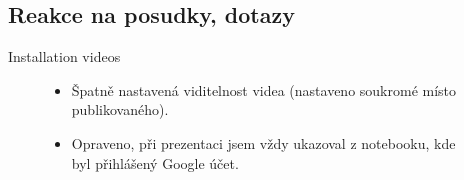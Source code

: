 \documentclass{beamer}
\begin{document}
  \begin{frame}{}
\end{frame}
    
    
  \begin{darkframes}
    \section{Reakce na posudky, dotazy}
     \begin{frame}{Installation videos}
     	\begin{figure}
\begin{itemize}
\item Špatně nastavená viditelnost videa (nastaveno soukromé místo publikovaného).
\item Opraveno, při prezentaci jsem vždy ukazoval z notebooku, kde byl přihlášený Google účet.
\end{itemize}
    \end{figure}
    \end{frame}


\end{darkframes}
\end{document}
